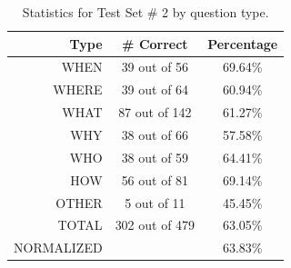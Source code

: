 \documentclass[11pt,letterpaper]{article}
\begin{document}

%

\begin{table}
\centering

	\begin{tabular}{|r|c|c|}
	\hline
	Type   & \# Correct & Percentage \\
	\hline
	\hline
	WHEN   &  39 out of   56 &  69.64\% \\
	\hline
	WHERE  &  39 out of   64 &  60.94\% \\
	\hline
	WHAT   &  87 out of  142 &  61.27\% \\
	\hline
	WHY    &  38 out of   66 &  57.58\% \\
	\hline
	WHO    &  38 out of   59 &  64.41\% \\
	\hline
	HOW    &  56 out of   81 &  69.14\% \\
	\hline
	OTHER  &   5 out of   11 &  45.45\% \\
	\hline
	\hline
	TOTAL  & 302 out of 479 &  63.05\% \\
	\tiny{NORMALIZED}  &  &  63.83\% \\
	\hline
	\end{tabular}

\caption{Statistics for Test Set \# 2 by question type.}
\label{table:question-types2}
\end{table}

%
%
\end{document}
